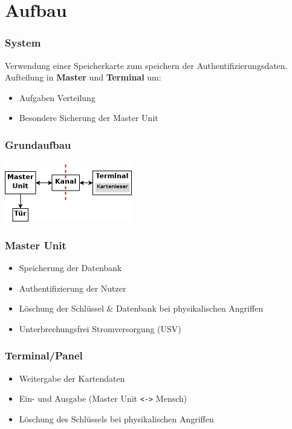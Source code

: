 \section{Aufbau}
\begin{frame}
	\frametitle{System}
	Verwendung einer Speicherkarte zum speichern der Authentifizierungsdaten.\\
	Aufteilung in \textbf{Master} und \textbf{Terminal} um:
	\begin{itemize}
	\item<2-> Aufgaben Verteilung
	\item<3-> Besondere Sicherung der Master Unit
	\end{itemize}
\end{frame}

\begin{frame}
	\frametitle{Grundaufbau}
	\begin{center}
		\includegraphics[width=210px]{grundaufbau}
	\end{center}
\end{frame}

\begin{frame}
	\frametitle{Master Unit}
	\begin{itemize}
		\item<2-> Speicherung der Datenbank
		\item<3-> Authentifizierung der Nutzer
		\item<4-> Löschung der Schlüssel \& Datenbank bei physikalischen Angriffen
		\item<5-> Unterbrechungsfrei Stromversorgung (USV)
	\end{itemize}
\end{frame}

\begin{frame}
	\frametitle{Terminal/Panel}
	\begin{itemize}
		\item<2-> Weitergabe der Kartendaten
		\item<3-> Ein- und Ausgabe \small{(Master Unit \texttt{<->} Mensch)}
		\item<4-> Löschung des Schlüssels bei physikalischen Angriffen
	\end{itemize}
\end{frame}

